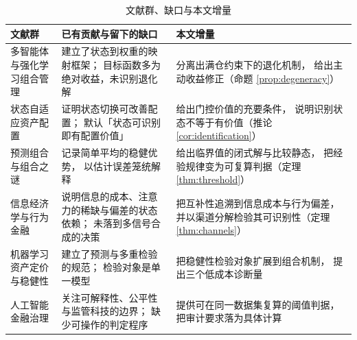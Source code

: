 \begin{table}[htbp]
\centering
\caption{文献群、缺口与本文增量}
\label{tab:lit-map}
\begin{threeparttable}
\footnotesize
\begin{tabular}{p{2.5cm}p{5.4cm}p{5.3cm}}
\toprule
文献群 & 已有贡献与留下的缺口 & 本文增量 \\
\midrule
多智能体与强化学习组合管理 & 建立了状态到权重的映射框架；
目标函数多为绝对收益，未识别退化解 & 分离出满仓约束下的退化机制，
给出主动收益修正（命题 \ref{prop:degeneracy}） \\
状态自适应资产配置 & 证明状态切换可改善配置；
默认「状态可识别即有配置价值」 & 给出门控价值的充要条件，
说明识别状态不等于有价值（推论 \ref{cor:identification}） \\
预测组合与组合之谜 & 记录简单平均的稳健优势，
以估计误差笼统解释 & 给出临界值的闭式解与比较静态，
把经验规律变为可复算判据（定理 \ref{thm:threshold}） \\
信息经济学与行为金融 & 说明信息的成本、注意力的稀缺与偏差的状态依赖；
未落到多信号合成的决策 & 把互补性追溯到信息成本与行为偏差，
并以渠道分解检验其可识别性（定理 \ref{thm:channels}） \\
机器学习资产定价与稳健性 & 建立了预测与多重检验的规范；
检验对象是单一模型 & 把稳健性检验对象扩展到组合机制，
提出三个低成本诊断量 \\
人工智能金融治理 & 关注可解释性、公平性与监管科技的边界；
缺少可操作的判定程序 & 提供可在同一数据集复算的阈值判据，
把审计要求落为具体计算 \\
\bottomrule
\end{tabular}
\end{threeparttable}
\end{table}
